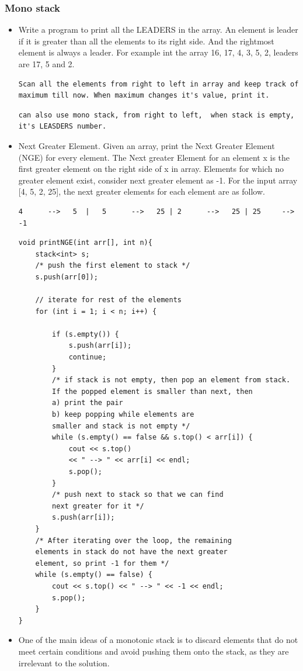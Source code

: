 \documentclass[a4paper,11pt,twoside]{book}
\begin{document}
\subsubsection{Mono stack}
\begin{itemize}
	
	\item  Write a program to print all the LEADERS in the array. An element is leader if it is greater than all the elements to its right side. And the rightmost element is always a leader. For example int the array {16, 17, 4, 3, 5, 2}, leaders are 17, 5 and 2.  
	
\begin{lstlisting}[breaklines]
Scan all the elements from right to left in array and keep track of maximum till now. When maximum changes it's value, print it.
\end{lstlisting}	

\begin{lstlisting}[breaklines]
can also use mono stack, from right to left,  when stack is empty, it's LEASDERS number. 
\end{lstlisting}	

	
	\item Next Greater Element.  Given an array, print the Next Greater Element (NGE) for every element. The Next greater Element for an element x is the first greater element on the right side of x in array. Elements for which no greater element exist, consider next greater element as -1. For the input array [4, 5, 2, 25], the next greater elements for
	each element are as follow.
\begin{verbatim}
4      -->   5  |  	5      -->   25 | 2      -->   25 | 25     -->   -1
\end{verbatim}

\begin{lstlisting}[breaklines]
void printNGE(int arr[], int n){
	stack<int> s;	
	/* push the first element to stack */
	s.push(arr[0]);

	// iterate for rest of the elements
	for (int i = 1; i < n; i++) {
		
		if (s.empty()) {
			s.push(arr[i]);
			continue;
		}		
		/* if stack is not empty, then pop an element from stack.
		If the popped element is smaller than next, then
		a) print the pair
		b) keep popping while elements are
		smaller and stack is not empty */
		while (s.empty() == false && s.top() < arr[i]) {
			cout << s.top() 
			<< " --> " << arr[i] << endl;
			s.pop();
		}	
		/* push next to stack so that we can find
		next greater for it */
		s.push(arr[i]);
	}	
	/* After iterating over the loop, the remaining
	elements in stack do not have the next greater
	element, so print -1 for them */
	while (s.empty() == false) {
		cout << s.top() << " --> " << -1 << endl;
		s.pop();
	}
}
\end{lstlisting}	

	\item One of the main ideas of a monotonic stack is to discard elements that do not meet certain conditions and avoid pushing them onto the stack, as they are irrelevant to the solution.

\end{itemize}	
\end{document}
